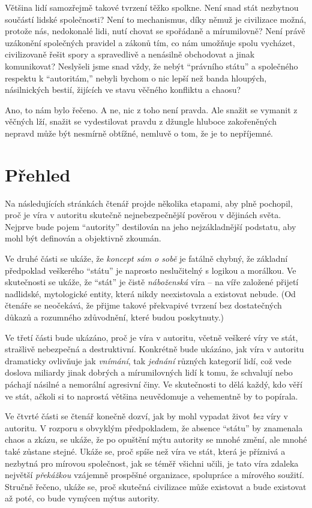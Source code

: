 \documentclass{book}
\begin{document}
Většina lidí samozřejmě takové tvrzení těžko spolkne. Není snad stát nezbytnou součástí lidské společnosti? Není to mechanismus, díky němuž je civilizace možná, protože nás, nedokonalé lidi, nutí chovat se spořádaně a mírumilovně? Není právě uzákonění společných pravidel a zákonů tím, co nám umožňuje spolu vycházet, civilizovaně řešit spory a spravedlivě a nenásilně obchodovat a jinak komunikovat? Neslyšeli jsme snad vždy, že nebýt \enquote{právního státu} a společného respektu k \enquote{autoritám,} nebyli bychom o nic lepší než banda hloupých, násilnických bestií, žijících ve stavu věčného konfliktu a chaosu?

Ano, to nám bylo řečeno. A ne, nic z toho není pravda. Ale snažit se vymanit z věčných lží, snažit se vydestilovat pravdu z džungle hluboce zakořeněných nepravd může být nesmírně obtížné, nemluvě o tom, že je to nepříjemné.

\section{Přehled}

Na následujících stránkách čtenář projde několika etapami, aby plně pochopil, proč je víra v autoritu skutečně nejnebezpečnější pověrou v dějinách světa. Nejprve bude pojem \enquote{autority} destilován na jeho nejzákladnější podstatu, aby mohl být definován a objektivně zkoumán.

Ve druhé části se ukáže, že \emph{koncept sám o sobě} je fatálně chybný, že základní předpoklad veškerého \enquote{státu} je naprosto neslučitelný s logikou a morálkou. Ve skutečnosti se ukáže, že \enquote{stát} je čistě \emph{náboženská} víra -- na víře založené přijetí nadlidské, mytologické entity, která nikdy neexistovala a existovat nebude. (Od čtenáře se neočekává, že přijme takové překvapivé tvrzení bez dostatečných důkazů a rozumného zdůvodnění, které budou poskytnuty.)

Ve třetí části bude ukázáno, proč je víra v autoritu, včetně veškeré víry ve stát, strašlivě nebezpečná a destruktivní. Konkrétně bude ukázáno, jak víra v autoritu dramaticky ovlivňuje jak \emph{vnímání}, tak \emph{jednání} různých kategorií lidí, což vede doslova miliardy jinak dobrých a mírumilovných lidí k tomu, že schvalují nebo páchají násilné a nemorální agresivní činy. Ve skutečnosti to dělá každý, kdo věří ve stát, ačkoli si to naprostá většina neuvědomuje a vehementně by to popírala.

Ve čtvrté části se čtenář konečně dozví, jak by mohl vypadat život \emph{bez} víry v autoritu. V rozporu s obvyklým předpokladem, že absence \enquote{státu} by znamenala chaos a zkázu, se ukáže, že po opuštění mýtu autority se mnohé změní, ale mnohé také zůstane stejné. Ukáže se, proč spíše než víra ve stát, která je příznivá a nezbytná pro mírovou společnost, jak se téměř všichni učili, je tato víra zdaleka největší \emph{překážkou} vzájemně prospěšné organizace, spolupráce a mírového soužití. Stručně řečeno, ukáže se, proč skutečná civilizace může existovat a bude existovat až poté, co bude vymýcen mýtus autority.
\end{document}
